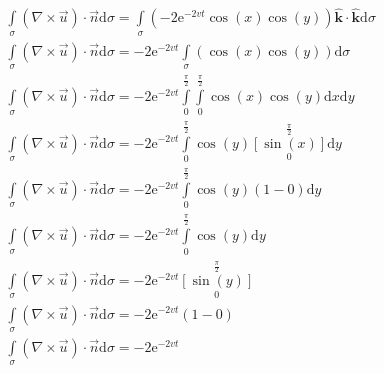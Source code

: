 \documentclass[a4paper,10pt,norsk]{article}
\newcommand{\dd}[1]{\mathrm{d}#1}
\newcommand{\uvec}[1]{\boldsymbol{\hat{\textbf{#1}}}}
\begin{document}
		 \begin{align*}
			 &\int\limits_ \sigma \left( \nabla \times \vec{u}  \right) \cdot \vec{n} \dd{\sigma} = \int\limits_ \sigma \left( -2 \mathrm{e}^{-2vt}\cos(x) \cos(y)   \right)\uvec{k} \cdot \uvec{k} \dd{\sigma} \\
			 &\int\limits_ \sigma \left( \nabla \times \vec{u}  \right) \cdot \vec{n} \dd{\sigma} =-2 \mathrm{e}^{-2vt} \int\limits_ \sigma\left( \cos(x) \cos(y)   \right) \dd{\sigma}\\
			 &\int\limits_ \sigma \left( \nabla \times \vec{u}  \right) \cdot \vec{n} \dd{\sigma} = -2 \mathrm{e}^{-2vt} \int\limits_0^{\frac{\pi}{2}} \int\limits_0^{\frac{\pi}{2}}\cos(x) \cos(y) \dd{x}\dd{y}\\
			 &\int\limits_ \sigma \left( \nabla \times \vec{u}  \right) \cdot \vec{n} \dd{\sigma} =-2 \mathrm{e}^{-2vt} \int\limits_0^{\frac{\pi}{2}}\cos(y) \left[\sin(x) \right]\limits_0^{\frac{\pi}{2}} \dd{y}\\
			 &\int\limits_ \sigma \left( \nabla \times \vec{u}  \right) \cdot \vec{n} \dd{\sigma} =-2 \mathrm{e}^{-2vt} \int\limits_0^{\frac{\pi}{2}}\cos(y) \left( 1-0 \right) \dd{y}\\
			 &\int\limits_ \sigma \left( \nabla \times \vec{u}  \right) \cdot \vec{n} \dd{\sigma} =-2 \mathrm{e}^{-2vt} \int\limits_0^{\frac{\pi}{2}}\cos(y) \dd{y}\\
			 &\int\limits_ \sigma \left( \nabla \times \vec{u}  \right) \cdot \vec{n} \dd{\sigma} =-2 \mathrm{e}^{-2vt}\left[\sin(y) \right]\limits_0^{\frac{\pi}{2}}\\
			 &\int\limits_ \sigma \left( \nabla \times \vec{u}  \right) \cdot \vec{n} \dd{\sigma} =-2 \mathrm{e}^{-2vt}\left( 1-0 \right) \\
			 &\int\limits_ \sigma \left( \nabla \times \vec{u}  \right) \cdot \vec{n} \dd{\sigma} =-2 \mathrm{e}^{-2vt}
		\end{align*}
\end{document}
